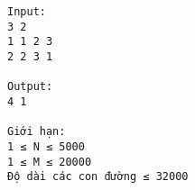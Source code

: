 \begin{verbatim}
Input:
3 2
1 1 2 3
2 2 3 1

Output:
4 1

Giới hạn:
1 ≤ N ≤ 5000
1 ≤ M ≤ 20000
Độ dài các con đường ≤ 32000
\end{verbatim}